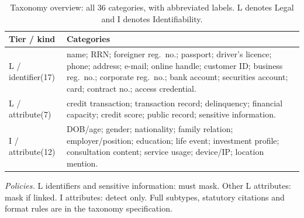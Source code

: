\begin{table}[t]
\caption{Taxonomy overview: all 36 categories, with abbreviated labels. L denotes Legal and I denotes Identifiability.}
\label{tab:taxonomy}
\small
\begin{tabularx}{\columnwidth}{@{}>{\RaggedRight\arraybackslash}p{}>{\RaggedRight\arraybackslash}X@{}}
\toprule
\textbf{Tier / kind} & \textbf{Categories} \\
\midrule
L / identifier\newline (17) & name; RRN; foreigner reg.\ no.; passport; driver's licence; phone; address; e-mail; online handle; customer ID; business reg.\ no.; corporate reg.\ no.; bank account; securities account; card; contract no.; access credential. \\
\addlinespace
L / attribute\newline (7) & credit transaction; transaction record; delinquency; financial capacity; credit score; public record; sensitive information. \\
\addlinespace
I / attribute\newline (12) & DOB/age; gender; nationality; family relation; employer/position; education; life event; investment profile; consultation content; service usage; device/IP; location mention. \\
\bottomrule
\end{tabularx}
\par\smallskip
\begin{minipage}{\columnwidth}
\RaggedRight\small
\textit{Policies.} L identifiers and sensitive information: must mask.
Other L attributes: mask if linked. I attributes: detect only.
Full subtypes, statutory citations and format rules are in the taxonomy specification.
\end{minipage}
\end{table}
